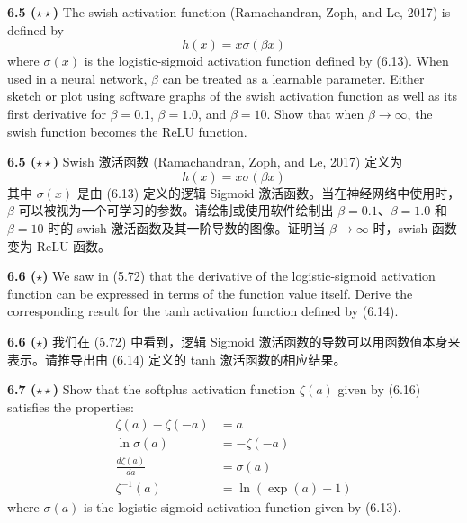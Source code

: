 \documentclass{article}
\begin{document}
\vspace{1em}

\textbf{6.5 ($\star\star$)} The swish activation function (Ramachandran, Zoph, and Le, 2017) is defined by
\begin{equation}
h(x) = x \sigma(\beta x)
\tag{6.61}
\end{equation}
where $\sigma(x)$ is the logistic-sigmoid activation function defined by (6.13). When used in a neural network, $\beta$ can be treated as a learnable parameter. Either sketch or plot using software graphs of the swish activation function as well as its first derivative for $\beta = 0.1$, $\beta = 1.0$, and $\beta = 10$. Show that when $\beta \to \infty$, the swish function becomes the ReLU function.

\textbf{6.5 ($\star\star$)} Swish 激活函数 (Ramachandran, Zoph, and Le, 2017) 定义为
\begin{equation}
h(x) = x \sigma(\beta x)
\tag{6.61}
\end{equation}
其中 $\sigma(x)$ 是由 (6.13) 定义的逻辑 Sigmoid 激活函数。当在神经网络中使用时，$\beta$ 可以被视为一个可学习的参数。请绘制或使用软件绘制出 $\beta = 0.1$、$\beta = 1.0$ 和 $\beta = 10$ 时的 swish 激活函数及其一阶导数的图像。证明当 $\beta \to \infty$ 时，swish 函数变为 ReLU 函数。

\vspace{1em}

\textbf{6.6 ($\star$)} We saw in (5.72) that the derivative of the logistic-sigmoid activation function can be expressed in terms of the function value itself. Derive the corresponding result for the tanh activation function defined by (6.14).

\textbf{6.6 ($\star$)} 我们在 (5.72) 中看到，逻辑 Sigmoid 激活函数的导数可以用函数值本身来表示。请推导出由 (6.14) 定义的 tanh 激活函数的相应结果。

\vspace{1em}

\textbf{6.7 ($\star\star$)} Show that the softplus activation function $\zeta(a)$ given by (6.16) satisfies the properties:
\begin{align}
\zeta(a) - \zeta(-a) &= a \tag{6.62} \\
\ln \sigma(a) &= -\zeta(-a) \tag{6.63} \\
\frac{d\zeta(a)}{da} &= \sigma(a) \tag{6.64} \\
\zeta^{-1}(a) &= \ln(\exp(a)-1) \tag{6.65}
\end{align}
where $\sigma(a)$ is the logistic-sigmoid activation function given by (6.13).
\end{document}
